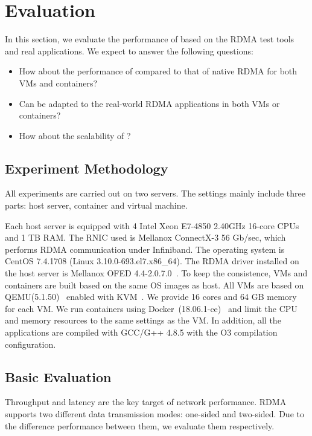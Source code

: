 \section{Evaluation} \label{eval}
In this section, we evaluate the performance of \sys based on the RDMA test tools and real applications. We expect to answer the following questions:

\begin{itemize}
\item How about the performance of \sys compared to that of native RDMA for both VMs and containers?
\item Can \sys be adapted to the real-world RDMA applications in both VMs or containers?
\item How about the scalability of \sys?
\end{itemize}

\subsection{Experiment Methodology}


All experiments are carried out on two servers. The settings mainly include three parts: host server, container and virtual machine. 

Each host server is equipped with 4 Intel Xeon E7-4850 2.40GHz 16-core CPUs and 1 TB RAM. The RNIC used is Mellanox ConnectX-3 56 Gb/sec, which performs RDMA communication under Infiniband.  The operating system is CentOS 7.4.1708 (Linux 3.10.0-693.el7.x86\_64). The RDMA driver installed on the host server is Mellanox OFED 4.4-2.0.7.0~\cite{mlnx-ofed}. To keep the consistence, VMs and containers are built based on the same OS images as host. All VMs are based on QEMU(5.1.50)~\cite{qemu} enabled with KVM~\cite{kvm}. We provide 16 cores and 64 GB memory for each VM. We run containers using Docker~(18.06.1-ce)~\cite{docker} and limit the CPU and memory resources to the same settings as the VM. In addition, all the applications are compiled with GCC/G++ 4.8.5 with the O3 compilation configuration. 


\subsection{Basic Evaluation}


Throughput and latency are the key target of network performance. RDMA supports two different data transmission modes: one-sided and two-sided. Due to the difference performance between them, we evaluate them respectively.

